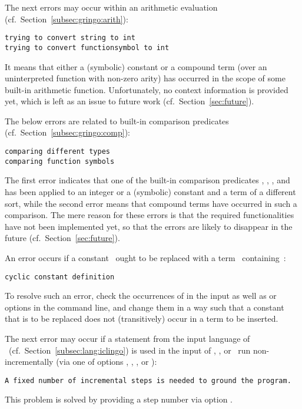 The next errors may occur within an arithmetic evaluation
(cf.\ Section~\ref{subsec:gringo:arith}):
%
\begin{lstlisting}[numbers=none,escapechar=@]
trying to convert string to int
trying to convert functionsymbol to int
\end{lstlisting}
%
It means that either a (symbolic) constant or a compound term
(over an uninterpreted function with non-zero arity)
has occurred in the scope of some built-in arithmetic function.
Unfortunately, no context information is provided yet,
which is left as an issue to future work
(cf.\ Section~\ref{sec:future}).

The below errors are related to built-in comparison predicates
(cf.\ Section~\ref{subsec:gringo:comp}):
%
\begin{lstlisting}[numbers=none,escapechar=@]
comparing different types
comparing function symbols
\end{lstlisting}
%
The first error indicates that one of the built-in comparison predicates
\code{<}, \code{<=}, \code{>}, and \code{>=}
has been applied to an integer or a (symbolic) constant
and a term of a different sort,
while the second error means that compound terms have occurred in such a comparison.
The mere reason for these errors is that the required functionalities
have not been implemented yet,
so that the errors are likely to disappear in the future
(cf.\ Section~\ref{sec:future}).

An error occurs if a constant~
ought to be replaced with a term~
containing~:
%
\begin{lstlisting}[numbers=none,escapechar=@]
cyclic constant definition
\end{lstlisting}
%
To resolve such an error, check the occurrences of 
in the input as well as  or  options
in the command line, and change them in a way such that a constant
that is to be replaced does not (transitively) occur in a term
to be inserted.

The next error may occur if a statement from the input language
of \iclingo\ (cf.\ Section~\ref{subsec:lang:iclingo})
is used in the input of \gringo, \clingo, or
\iclingo\ run non-incrementally
(via one of options , , ,
 or ):
%
\begin{lstlisting}[numbers=none,escapechar=@]
A fixed number of incremental steps is needed to ground the program.
\end{lstlisting}
%
This problem is solved by providing a step number
via option .


